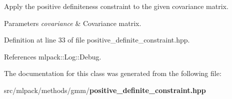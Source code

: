 Apply the positive definiteness constraint to the given covariance matrix. 


\begin{DoxyParams}{Parameters}
{\em covariance} & Covariance matrix. \\
\hline
\end{DoxyParams}


Definition at line 33 of file positive\-\_\-definite\-\_\-constraint.\-hpp.



References mlpack\-::\-Log\-::\-Debug.



The documentation for this class was generated from the following file\-:\begin{DoxyCompactItemize}
\item 
src/mlpack/methods/gmm/{\bf positive\-\_\-definite\-\_\-constraint.\-hpp}\end{DoxyCompactItemize}
